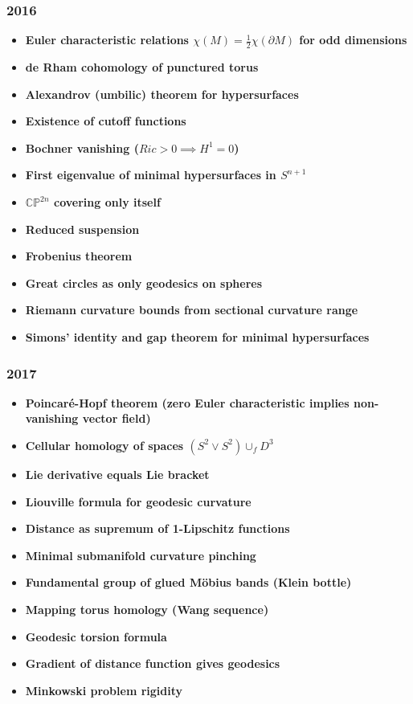 \subsubsection*{2016}
\begin{itemize}
    \item \textbf{Euler characteristic relations $\chi(M) = \frac{1}{2}\chi(\partial M)$ for odd dimensions}
    \item \textbf{de Rham cohomology of punctured torus}
    \item \textbf{Alexandrov (umbilic) theorem for hypersurfaces}
    \item \textbf{Existence of cutoff functions}
    \item \textbf{Bochner vanishing ($Ric > 0 \implies H^1 = 0$)}
    \item \textbf{First eigenvalue of minimal hypersurfaces in $S^{n+1}$}
    \item \textbf{$\mathbb{CP}^{2n}$ covering only itself}
    \item \textbf{Reduced suspension}
    \item \textbf{Frobenius theorem}
    \item \textbf{Great circles as only geodesics on spheres}
    \item \textbf{Riemann curvature bounds from sectional curvature range}
    \item \textbf{Simons' identity and gap theorem for minimal hypersurfaces}
\end{itemize}

\subsubsection*{2017}
\begin{itemize}
    \item \textbf{Poincaré-Hopf theorem (zero Euler characteristic implies non-vanishing vector field)}
    \item \textbf{Cellular homology of spaces $(S^2 \vee S^2) \cup_f D^3$}
    \item \textbf{Lie derivative equals Lie bracket}
    \item \textbf{Liouville formula for geodesic curvature}
    \item \textbf{Distance as supremum of 1-Lipschitz functions}
    \item \textbf{Minimal submanifold curvature pinching}
    \item \textbf{Fundamental group of glued M\"obius bands (Klein bottle)}
    \item \textbf{Mapping torus homology (Wang sequence)}
    \item \textbf{Geodesic torsion formula}
    \item \textbf{Gradient of distance function gives geodesics}
    \item \textbf{Minkowski problem rigidity}
\end{itemize}

